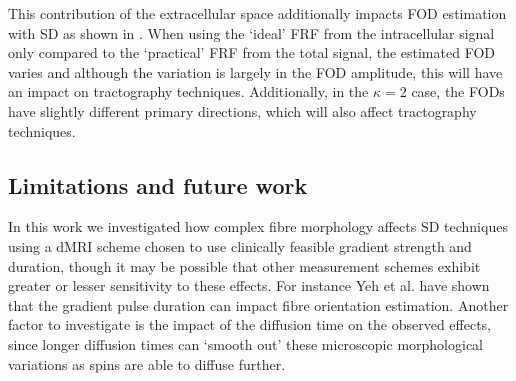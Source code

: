 This contribution of the extracellular space additionally impacts \ac{FOD} estimation with \acl{SD} as shown in .
When using the `ideal' \ac{FRF} from the intracellular signal only compared to the `practical' \ac{FRF} from the total signal, the estimated \ac{FOD} varies and although the variation is largely in the \ac{FOD} amplitude, this will have an impact on tractography techniques. Additionally, in the $\kappa=2$ case, the \ac{FOD}s have slightly different primary directions, which will also affect tractography techniques.

\subsection{Limitations and future work }
\label{sec:frf_limitations}
In this work we investigated how complex fibre morphology affects \acl{SD} techniques using a \ac{dMRI} scheme chosen to use clinically feasible gradient strength and duration, though it may be possible that other measurement schemes exhibit greater or lesser sensitivity to these effects. For instance Yeh et al. \cite{Yeh2010} have shown that the gradient pulse duration can impact fibre orientation estimation.
Another factor to investigate is the impact of the diffusion time on the observed effects, since longer diffusion times can `smooth out' these microscopic morphological variations as spins are able to diffuse further.


